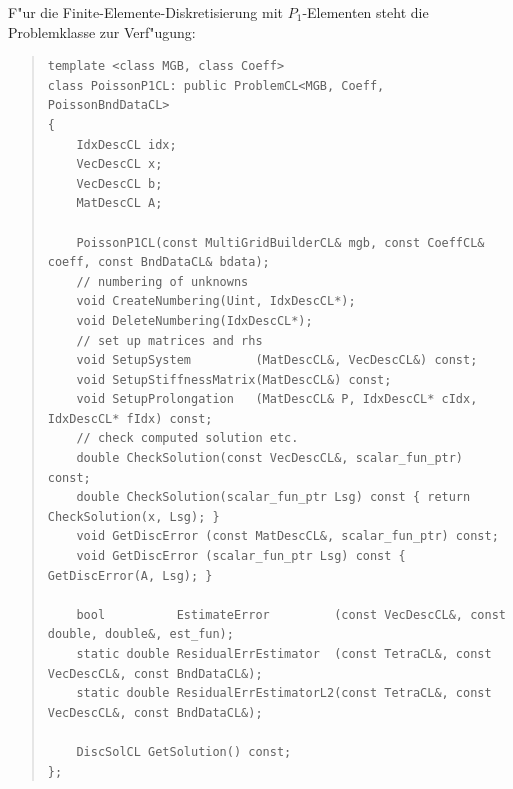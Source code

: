 \documentclass[11pt,a4paper]{article}
\newenvironment{Code}{\begin{quote}\scriptsize}{\end{quote}}
\begin{document}
F"ur die Finite-Elemente-Diskretisierung mit $P_1$-Elementen steht die
Problemklasse  zur Verf"ugung:
\begin{Code}
\begin{verbatim}
template <class MGB, class Coeff>
class PoissonP1CL: public ProblemCL<MGB, Coeff, PoissonBndDataCL>
{
    IdxDescCL idx;
    VecDescCL x;
    VecDescCL b;
    MatDescCL A;
    
    PoissonP1CL(const MultiGridBuilderCL& mgb, const CoeffCL& coeff, const BndDataCL& bdata);
    // numbering of unknowns
    void CreateNumbering(Uint, IdxDescCL*);
    void DeleteNumbering(IdxDescCL*);
    // set up matrices and rhs
    void SetupSystem         (MatDescCL&, VecDescCL&) const;
    void SetupStiffnessMatrix(MatDescCL&) const;
    void SetupProlongation   (MatDescCL& P, IdxDescCL* cIdx, IdxDescCL* fIdx) const;
    // check computed solution etc.
    double CheckSolution(const VecDescCL&, scalar_fun_ptr) const;
    double CheckSolution(scalar_fun_ptr Lsg) const { return CheckSolution(x, Lsg); }
    void GetDiscError (const MatDescCL&, scalar_fun_ptr) const;
    void GetDiscError (scalar_fun_ptr Lsg) const { GetDiscError(A, Lsg); }

    bool          EstimateError         (const VecDescCL&, const double, double&, est_fun);
    static double ResidualErrEstimator  (const TetraCL&, const VecDescCL&, const BndDataCL&);
    static double ResidualErrEstimatorL2(const TetraCL&, const VecDescCL&, const BndDataCL&);

    DiscSolCL GetSolution() const;
};
\end{verbatim}
\end{Code}
\end{document}

